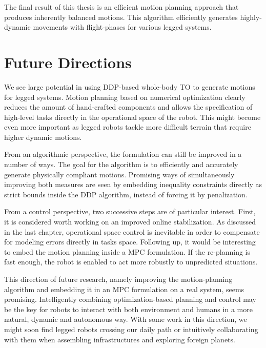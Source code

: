 The final result of this thesis is an efficient motion planning approach that produces inherently balanced motions. This algorithm efficiently generates highly-dynamic movements with flight-phases for various legged systems. 

\section{Future Directions}
We see large potential in using \gls{DDP}-based whole-body \gls{TO} to generate motions for legged systems. Motion planning based on numerical optimization clearly reduces the amount of hand-crafted components and allows the specification of high-level tasks directly in the operational space of the robot. This might become even more important as legged robots tackle more difficult terrain that require higher dynamic motions.
  
From an algorithmic perspective, the formulation can still be improved in a number of ways. The goal for the algorithm is to efficiently and accurately generate physically compliant motions. Promising ways of simultaneously improving both measures are seen by embedding inequality constraints directly as strict bounds inside the \gls{DDP} algorithm, instead of forcing it by penalization.

From a control perspective, two successive steps are of particular interest. First, it is considered worth working on an improved online stabilization. As discussed in the last chapter, operational space control is inevitable in order to compensate for modeling errors directly in tasks space. Following up, it would be interesting to embed the motion planning inside a \gls{MPC} formulation. If the re-planning is fast enough, the robot is enabled to act more robustly to unpredicted situations. 

This direction of future research, namely improving the motion-planning algorithm and embedding it in an \gls{MPC} formulation on a real system, seems promising. Intelligently combining optimization-based planning and control may be the key for robots to interact with both environment and humans in a more natural, dynamic and autonomous way. With some work in this direction, we might soon find legged robots crossing our daily path or intuitively collaborating with them when assembling infrastructures and exploring foreign planets. 